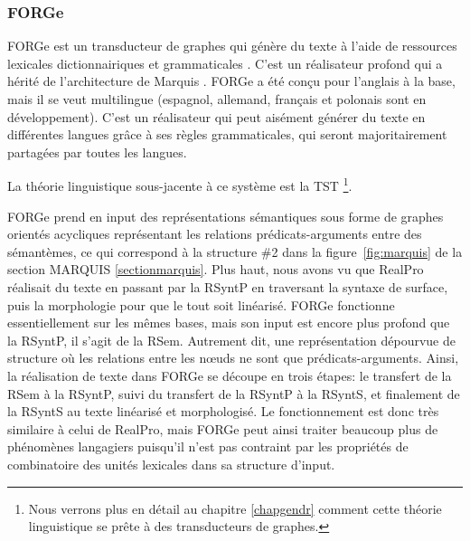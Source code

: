 \subsubsection{FORGe}
FORGe est un transducteur de graphes qui génère du texte à l'aide de ressources lexicales dictionnairiques et grammaticales \citep{MilledemoFORGePompeu2017,DBLP:conf/semeval/MilleCBW17}. C'est un réalisateur profond qui a hérité de l'architecture de Marquis \citep{WannerMARQUISGENERATIONUSERTAILORED2010}. FORGe a été conçu pour l'anglais à la base, mais il se veut multilingue (espagnol, allemand, français et polonais sont en développement). C'est un réalisateur qui peut aisément générer du texte en différentes langues grâce à ses règles grammaticales, qui seront majoritairement partagées par toutes les langues.

La théorie linguistique sous-jacente à ce système est la \ac{TST} \citep{melcuk1988, mel2012semantics, PolgueretheorieSensTexte1998, Milicevic2007ASG} \footnote{Nous verrons plus en détail au chapitre \ref{chapgendr} comment cette théorie linguistique se prête à des transducteurs de graphes.}.

FORGe prend en input des représentations sémantiques sous forme de graphes orientés acycliques représentant les relations prédicats-arguments entre des sémantèmes, ce qui correspond à la structure \#2 dans la figure~\ref{fig:marquis} de la section MARQUIS \ref{sectionmarquis}. Plus haut, nous avons vu que RealPro \citep{LavoieFastPortableRealizer1997} réalisait du texte en passant par la \ac{RSyntP} en traversant la syntaxe de surface, puis la morphologie pour que le tout soit linéarisé. FORGe fonctionne essentiellement sur les mêmes bases, mais son input est encore plus profond que la \ac{RSyntP}, il s'agit de la \ac{RSem}. Autrement dit, une représentation dépourvue de structure où les relations entre les n\oe{}uds ne sont que prédicats-arguments. Ainsi, la réalisation de texte dans FORGe se découpe en trois étapes: le transfert de la \ac{RSem} à la \ac{RSyntP}, suivi du transfert de la \ac{RSyntP} à la \ac{RSyntS}, et finalement de la \ac{RSyntS} au texte linéarisé et morphologisé. Le fonctionnement est donc très similaire à celui de RealPro, mais FORGe peut ainsi traiter beaucoup plus de phénomènes langagiers puisqu'il n'est pas contraint par les propriétés de combinatoire des unités lexicales dans sa structure d'input.

